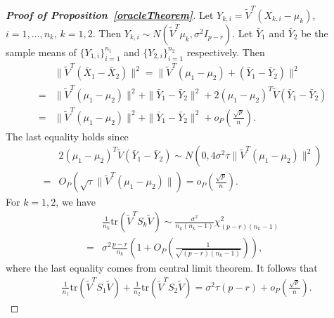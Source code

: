\documentclass[review]{elsarticle}
\theoremstyle{plain}
\theoremstyle{definition}
\theoremstyle{remark}
\begin{document}
\begin{proof}[\textbf{Proof of Proposition~\ref{oracleTheorem}}]
    Let $Y_{k,i}=\tilde{V}^T (X_{k,i}-\mu_k)$, $i=1,\ldots,n_k$, $k=1,2$.
    Then $Y_{k,i}\sim N(\tilde{V}^T\mu_k,\sigma^2 I_{p-r})$.
    Let $\bar{Y}_1$ and $\bar{Y}_2$ be the sample means of $\{Y_{1,i}\}_{i=1}^{n_1}$ and $\{Y_{2,i}\}_{i=1}^{n_2}$ respectively. 
    Then
    \begin{equation}\label{prop1eq1}
        \begin{aligned}
            &\|\tilde{V}^T(\bar{X}_1-\bar{X}_2)\|^2
            =\|\tilde{V}^T(\mu_1-\mu_2)+(\bar{Y}_1-\bar{Y}_2)\|^2\\
            =&\|\tilde{V}^T(\mu_1-\mu_2)\|^2+\|\bar{Y}_1-\bar{Y}_2\|^2+
            2{(\mu_1-\mu_2)}^T\tilde{V}(\bar{Y}_1-\bar{Y}_2)\\
            =&\|\tilde{V}^T(\mu_1-\mu_2)\|^2+\|\bar{Y}_1-\bar{Y}_2\|^2+
            o_P(\frac{\sqrt{p}}{n}).
        \end{aligned}
    \end{equation}
    The last equality holds since
    \begin{equation*}
        \begin{aligned}
            &2{(\mu_1-\mu_2)}^T\tilde{V}(\bar{Y}_1-\bar{Y}_2)\sim N(0,4\sigma^2 \tau \|\tilde{V}^T(\mu_1-\mu_2)\|^2)\\
            =& O_P(\sqrt{\tau}\|\tilde{V}^T(\mu_1-\mu_2)\| )=o_P(\frac{\sqrt{p}}{n}).
        \end{aligned}
    \end{equation*}
    For $k=1,2$, we have
    \begin{equation*}
        \begin{aligned}
            &\frac{1}{n_k} \mathrm{tr}(\tilde{V}^T S_k \tilde{V})\sim \frac{\sigma^2}{n_k(n_k-1)}\chi^2_{(p-r)(n_k-1)}\\
            =&
            \sigma^2\frac{p-r}{n_k}(1+O_P(\frac{1}{\sqrt{(p-r)(n_k-1)}})),
        \end{aligned}
    \end{equation*}
    where the last equality comes from central limit theorem. It follows that
    \begin{equation}\label{prop1eq2}
        \begin{aligned}
            &\frac{1}{n_1} \mathrm{tr}(\tilde{V}^T S_1 \tilde{V})+
            \frac{1}{n_2} \mathrm{tr}(\tilde{V}^T S_2 \tilde{V})=\sigma^2 \tau (p-r)+o_P(\frac{\sqrt{p}}{n}).
        \end{aligned}
    \end{equation}


\end{proof}
\end{document}
